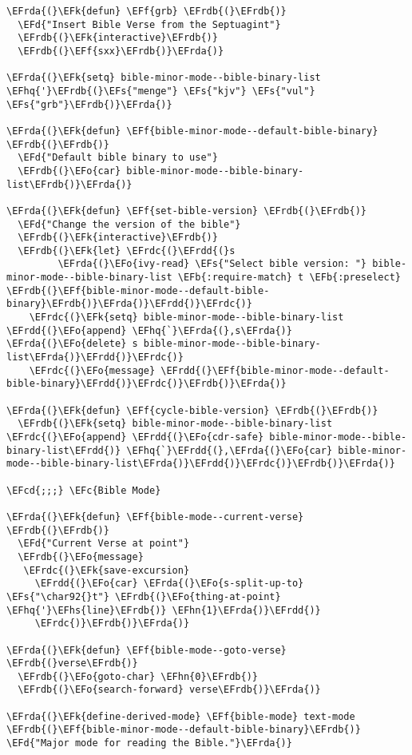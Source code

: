 \documentclass[a4wide,10pt]{article}
\newcommand{\EFc}[1]{\textcolor{EFc}{#1}} %
\newcommand{\EFcd}[1]{\textcolor{EFcd}{#1}} %
\newcommand{\EFs}[1]{\textcolor{EFs}{#1}} %
\newcommand{\EFd}[1]{\textcolor{EFd}{#1}} %
\newcommand{\EFk}[1]{\textcolor{EFk}{#1}} %
\newcommand{\EFb}[1]{\textcolor{EFb}{#1}} %
\newcommand{\EFf}[1]{\textcolor{EFf}{#1}} %
\newcommand{\EFo}[1]{\textcolor{EFo}{#1}} %
\newcommand{\EFhn}[1]{\textcolor{EFhn}{\textbf{#1}}} %
\newcommand{\EFhq}[1]{\textcolor{EFhq}{#1}} %
\newcommand{\EFhs}[1]{\textcolor{EFhs}{#1}} %
\newcommand{\EFrda}[1]{\textcolor{EFrda}{#1}} %
\newcommand{\EFrdb}[1]{\textcolor{EFrdb}{#1}} %
\newcommand{\EFrdc}[1]{\textcolor{EFrdc}{#1}} %
\newcommand{\EFrdd}[1]{\textcolor{EFrdd}{#1}} %
\begin{document}
\begin{Code}
\begin{Verbatim}
\EFrda{(}\EFk{defun} \EFf{grb} \EFrdb{(}\EFrdb{)}
  \EFd{"Insert Bible Verse from the Septuagint"}
  \EFrdb{(}\EFk{interactive}\EFrdb{)}
  \EFrdb{(}\EFf{sxx}\EFrdb{)}\EFrda{)}

\EFrda{(}\EFk{setq} bible-minor-mode--bible-binary-list \EFhq{'}\EFrdb{(}\EFs{"menge"} \EFs{"kjv"} \EFs{"vul"} \EFs{"grb"}\EFrdb{)}\EFrda{)}

\EFrda{(}\EFk{defun} \EFf{bible-minor-mode--default-bible-binary} \EFrdb{(}\EFrdb{)}
  \EFd{"Default bible binary to use"}
  \EFrdb{(}\EFo{car} bible-minor-mode--bible-binary-list\EFrdb{)}\EFrda{)}

\EFrda{(}\EFk{defun} \EFf{set-bible-version} \EFrdb{(}\EFrdb{)}
  \EFd{"Change the version of the bible"}
  \EFrdb{(}\EFk{interactive}\EFrdb{)}
  \EFrdb{(}\EFk{let} \EFrdc{(}\EFrdd{(}s
         \EFrda{(}\EFo{ivy-read} \EFs{"Select bible version: "} bible-minor-mode--bible-binary-list \EFb{:require-match} t \EFb{:preselect} \EFrdb{(}\EFf{bible-minor-mode--default-bible-binary}\EFrdb{)}\EFrda{)}\EFrdd{)}\EFrdc{)}
    \EFrdc{(}\EFk{setq} bible-minor-mode--bible-binary-list \EFrdd{(}\EFo{append} \EFhq{`}\EFrda{(},s\EFrda{)} \EFrda{(}\EFo{delete} s bible-minor-mode--bible-binary-list\EFrda{)}\EFrdd{)}\EFrdc{)}
    \EFrdc{(}\EFo{message} \EFrdd{(}\EFf{bible-minor-mode--default-bible-binary}\EFrdd{)}\EFrdc{)}\EFrdb{)}\EFrda{)}

\EFrda{(}\EFk{defun} \EFf{cycle-bible-version} \EFrdb{(}\EFrdb{)}
  \EFrdb{(}\EFk{setq} bible-minor-mode--bible-binary-list \EFrdc{(}\EFo{append} \EFrdd{(}\EFo{cdr-safe} bible-minor-mode--bible-binary-list\EFrdd{)} \EFhq{`}\EFrdd{(},\EFrda{(}\EFo{car} bible-minor-mode--bible-binary-list\EFrda{)}\EFrdd{)}\EFrdc{)}\EFrdb{)}\EFrda{)}

\EFcd{;;;} \EFc{Bible Mode}

\EFrda{(}\EFk{defun} \EFf{bible-mode--current-verse} \EFrdb{(}\EFrdb{)}
  \EFd{"Current Verse at point"}
  \EFrdb{(}\EFo{message}
   \EFrdc{(}\EFk{save-excursion}
     \EFrdd{(}\EFo{car} \EFrda{(}\EFo{s-split-up-to} \EFs{"\char92{}t"} \EFrdb{(}\EFo{thing-at-point} \EFhq{'}\EFhs{line}\EFrdb{)} \EFhn{1}\EFrda{)}\EFrdd{)}
     \EFrdc{)}\EFrdb{)}\EFrda{)}

\EFrda{(}\EFk{defun} \EFf{bible-mode--goto-verse} \EFrdb{(}verse\EFrdb{)}
  \EFrdb{(}\EFo{goto-char} \EFhn{0}\EFrdb{)}
  \EFrdb{(}\EFo{search-forward} verse\EFrdb{)}\EFrda{)}

\EFrda{(}\EFk{define-derived-mode} \EFf{bible-mode} text-mode \EFrdb{(}\EFf{bible-minor-mode--default-bible-binary}\EFrdb{)} \EFd{"Major mode for reading the Bible."}\EFrda{)}


\end{Verbatim}
\end{Code}
\end{document}
